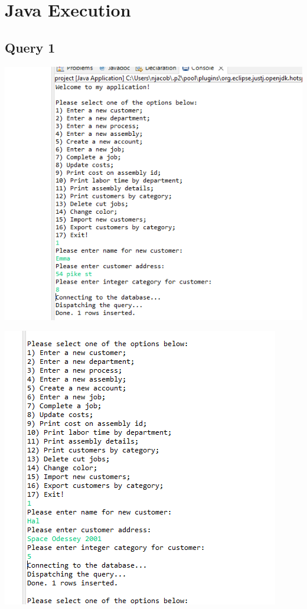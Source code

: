 \documentclass[11pt]{article}
\begin{document}
\section{Java Execution}
\subsection{Query 1}
\includegraphics[width = \textwidth]{cust1.png}

\includegraphics[width = \textwidth]{cust2.png}
\end{document}
